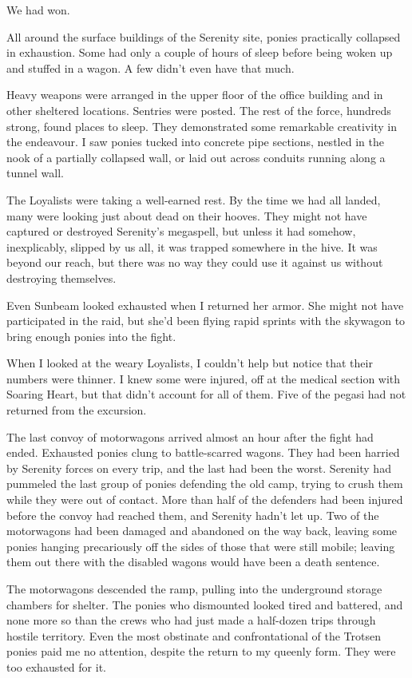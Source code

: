 We had won.

{\br}%
All around the surface buildings of the Serenity site, ponies practically collapsed in exhaustion. Some had only a couple of hours of sleep before being woken up and stuffed in a wagon. A few didn’t even have that much.

Heavy weapons were arranged in the upper floor of the office building and in other sheltered locations. Sentries were posted. The rest of the force, hundreds strong, found places to sleep. They demonstrated some remarkable creativity in the endeavour. I saw ponies tucked into concrete pipe sections, nestled in the nook of a partially collapsed wall, or laid out across conduits running along a tunnel wall.

The Loyalists were taking a well-earned rest. By the time we had all landed, many were looking just about dead on their hooves. They might not have captured or destroyed Serenity’s megaspell, but unless it had somehow, inexplicably, slipped by us all, it was trapped somewhere in the hive. It was beyond our reach, but there was no way they could use it against us without destroying themselves.

Even Sunbeam looked exhausted when I returned her armor. She might not have participated in the raid, but she’d been flying rapid sprints with the skywagon to bring enough ponies into the fight.

When I looked at the weary Loyalists, I couldn’t help but notice that their numbers were thinner. I knew some were injured, off at the medical section with Soaring Heart, but that didn’t account for all of them. Five of the pegasi had not returned from the excursion.

The last convoy of motorwagons arrived almost an hour after the fight had ended. Exhausted ponies clung to battle-scarred wagons. They had been harried by Serenity forces on every trip, and the last had been the worst. Serenity had pummeled the last group of ponies defending the old camp, trying to crush them while they were out of contact. More than half of the defenders had been injured before the convoy had reached them, and Serenity hadn’t let up. Two of the motorwagons had been damaged and abandoned on the way back, leaving some ponies hanging precariously off the sides of those that were still mobile; leaving them out there with the disabled wagons would have been a death sentence.

The motorwagons descended the ramp, pulling into the underground storage chambers for shelter. The ponies who dismounted looked tired and battered, and none more so than the crews who had just made a half-dozen trips through hostile territory. Even the most obstinate and confrontational of the Trotsen ponies paid me no attention, despite the return to my queenly form. They were too exhausted for it.

